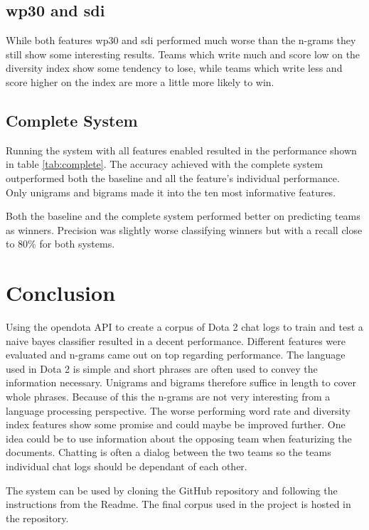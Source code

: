 \documentclass[12pt,a4paper]{article}
\begin{document}
\subsection{wp30 and sdi}
While both features wp30 and sdi performed much worse than the n-grams they still show some
interesting results.
Teams which write much and score low on the diversity index show some tendency to lose,
while teams which write less and score higher on the index are more a little more likely to win.


\subsection{Complete System}
Running the system with all features enabled resulted in the performance shown in table \ref{tab:complete}.
The accuracy achieved with the complete system outperformed both the baseline and all the feature's
individual performance.
Only unigrams and bigrams made it into the ten most informative features.

Both the baseline and the complete system performed better on predicting teams as winners.
Precision was slightly worse classifying winners but with a recall close to 80\% for both systems.

\section{Conclusion}
Using the opendota API to create a corpus of Dota 2 chat logs to train and test a naive bayes classifier
resulted in a decent performance.
Different features were evaluated and n-grams came out on top regarding performance.
The language used in Dota 2 is simple and short phrases are often used to convey the information necessary.
Unigrams and bigrams therefore suffice in length to cover whole phrases.
Because of this the n-grams are not very interesting from a language processing perspective.
The worse performing word rate and diversity index features show some promise and could maybe be improved
further.
One idea could be to use information about the opposing team when featurizing the documents.
Chatting is often a dialog between the two teams so the teams individual chat logs should be dependant
of each other.

The system can be used by cloning the GitHub repository and following the instructions from the Readme.
The final corpus used in the project is hosted in the repository.

\pagebreak


\end{document}
